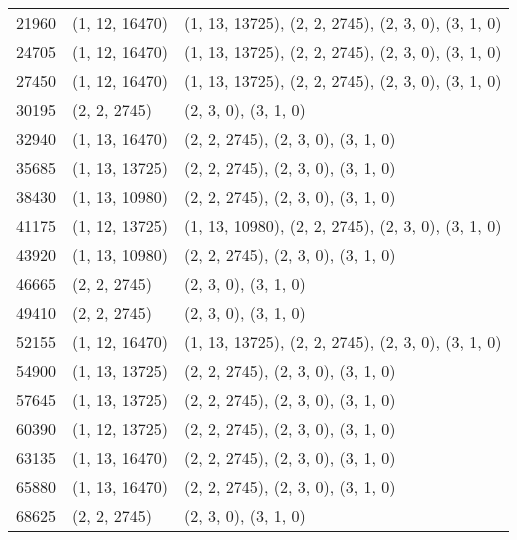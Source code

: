 \begin{longtable}{@{\extracolsep{\fill}}lll}
  21960              & (1, 12, 16470)              & (1, 13, 13725), (2, 2, 2745), (2, 3, 0), (3, 1, 0)  \\
  24705              & (1, 12, 16470)              & (1, 13, 13725), (2, 2, 2745), (2, 3, 0), (3, 1, 0)  \\
  27450              & (1, 12, 16470)              & (1, 13, 13725), (2, 2, 2745), (2, 3, 0), (3, 1, 0)  \\
  30195              & (2, 2, 2745)                & (2, 3, 0), (3, 1, 0)                                \\
  32940              & (1, 13, 16470)              & (2, 2, 2745), (2, 3, 0), (3, 1, 0)                  \\
  35685              & (1, 13, 13725)              & (2, 2, 2745), (2, 3, 0), (3, 1, 0)                  \\
  38430              & (1, 13, 10980)              & (2, 2, 2745), (2, 3, 0), (3, 1, 0)                  \\
  41175              & (1, 12, 13725)              & (1, 13, 10980), (2, 2, 2745), (2, 3, 0), (3, 1, 0)  \\
  43920              & (1, 13, 10980)              & (2, 2, 2745), (2, 3, 0), (3, 1, 0)                  \\
  46665              & (2, 2, 2745)                & (2, 3, 0), (3, 1, 0)                                \\
  49410              & (2, 2, 2745)                & (2, 3, 0), (3, 1, 0)                                \\
  52155              & (1, 12, 16470)              & (1, 13, 13725), (2, 2, 2745), (2, 3, 0), (3, 1, 0)  \\
  54900              & (1, 13, 13725)              & (2, 2, 2745), (2, 3, 0), (3, 1, 0)                  \\
  57645              & (1, 13, 13725)              & (2, 2, 2745), (2, 3, 0), (3, 1, 0)                  \\
  60390              & (1, 12, 13725)              & (2, 2, 2745), (2, 3, 0), (3, 1, 0)                  \\
  63135              & (1, 13, 16470)              & (2, 2, 2745), (2, 3, 0), (3, 1, 0)                  \\
  65880              & (1, 13, 16470)              & (2, 2, 2745), (2, 3, 0), (3, 1, 0)                  \\
  68625              & (2, 2, 2745)                & (2, 3, 0), (3, 1, 0)                                \\

\end{longtable}
